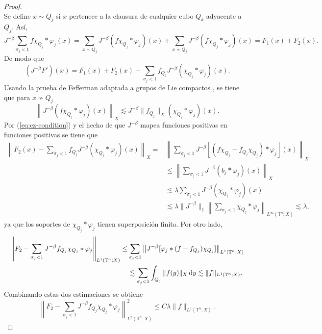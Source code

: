 \begin{proof}
\begin{equation*}
	\end{equation*}
	Se define $x \sim Q_j$ si $x$ pertenece a la clausura de cualquier cubo $Q_k$ adyacente a $Q_j$. Así,
	\begin{equation*}
		J^{-\beta}\sum_{\sigma_j < 1}f\chi_{Q_j} * \varphi_j (x) = \sum_{x\sim Q_j}J^{-\beta} (f\chi_{Q_j} * \varphi_j )(x) + \sum_{x\nsim Q_j}J^{-\beta} (f\chi_{Q_j} * \varphi_j )(x)  = F_1(x) + F_2(x).
	\end{equation*}
	De modo que
	\begin{equation*}
		(J^{-\beta} F')(x) = F_1(x) + F_2(x) - \sum_{\sigma_j < 1}f_{Q_j}J^{-\beta} (\chi_{Q_j}*\varphi_j)(x).
	\end{equation*}
	Usando la prueba de Fefferman adaptada a grupos de Lie compactos \cite{cardona-ruzhansky}, se tiene que para $x \nsim Q_j$
	\begin{equation*}
		\left\|J^{-\beta} (f\chi_{Q_j} *\varphi_j)(x)\right\|_X \lesssim J^{-\beta} \|f_{Q_j}\|_X (\chi_{Q_j}*\varphi_j)(x).
	\end{equation*}
	Por (\ref{eq:cz-condition}) y el hecho de que $J^{-\beta}$ mapea funciones positivas en funciones positivas se tiene que
	\begin{align*}
		\left\| F_2(x) - \sum_{\sigma_j<1} f_{Q_j}J^{-\beta}(\chi_{Q_j} * \varphi_j)(x) \right\|_X = & \left\| \sum_{\sigma_j<1} J^{-\beta}[(f\chi_{Q_j} - f_{Q_j}\chi_{Q_j}) * \varphi_j](x) \right\|_X \\
		 &\leq \left\| \sum_{\sigma_j<1} J^{-\beta}(b_j * \varphi_j)(x) \right\|_X \\
		 & \lesssim\lambda \sum_{\sigma_j<1} J^{-\beta} (\chi_{Q_j}*\varphi_j)(x)\\
		 & \lesssim \lambda \|J^{-\beta}\|_1\left\| \sum_{\sigma_j <1}\chi_{Q_j} *\varphi_j \right\|_{L^\infty(\mathbb{T}^n; X)} \lesssim \lambda ,
	\end{align*}
	ya que los soportes de $ \chi_{Q_j} * \varphi_j $ tienen superposición finita. Por otro lado,
	\begin{align*}
		\left\| F_2 - \sum_{\sigma_j < 1} J^{-\beta} f_{Q_j}\chi_{Q_j} * \varphi_j \right\|_{L^1(\mathbb{T}^n; X)} \leq & \sum_{\sigma_j<1} \left\|J^{-\beta}[\varphi_j * (f - f_{Q_j})\chi_{Q_j}]\right\|_{L^1(\mathbb{T}^n; X)} \\
		 & \lesssim \sum_{\sigma_j < 1}\int_{Q_j}\|f(y)\|_X \mathop{}\!\mathrm{d} y \lesssim \|f\|_{L^1(\mathbb{T}^n; X)}.
	\end{align*}
	Combinando estas dos estimaciones se obtiene
	\begin{equation*}
		\left\| F_2 - \sum_{\sigma_j < 1} J^{-\beta} f_{Q_j}\chi_{Q_j} * \varphi_j \right\|_{L^2(\mathbb{T}^n; X)}^2 \leq C\lambda\|f\|_{L^1(\mathbb{T}^n; X)} .

\end{equation*}
\end{proof}
